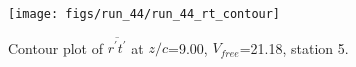 \begin{figure}[H]
\centering
\texttt{[image: figs/run\_44/run\_44\_rt\_contour]}
\caption{Contour plot of $\overline{r^\prime t^\prime}$ at $z/c$=9.00, $V_{free}$=21.18, station 5.}
\label{fig:run_44_rt_contour}
\end{figure}


